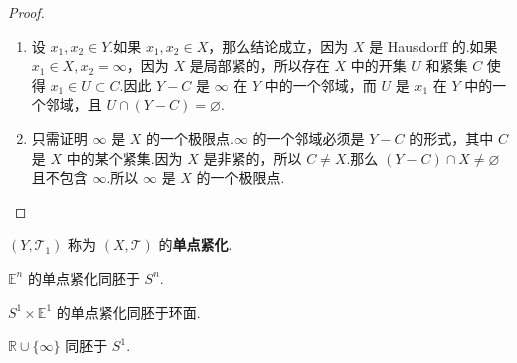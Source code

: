 \begin{proof}
\begin{enumerate}
        \item[(4)] 设 $x_1, x_2 \in Y$.如果 $x_1, x_2 \in X$，那么结论成立，因为 $X$ 是 Hausdorff 的.如果 $x_1 \in X, x_2 = \infty$，因为 $X$ 是局部紧的，所以存在 $X$ 中的开集 $U$ 和紧集 $C$ 使得 $x_1 \in U \subset C$.因此 $Y-C$ 是 $\infty$ 在 $Y$ 中的一个邻域，而 $U$ 是 $x_1$ 在 $Y$ 中的一个邻域，且 $U \cap (Y-C) = \varnothing$.
        \item[(5)] 只需证明 $\infty$ 是 $X$ 的一个极限点.$\infty$ 的一个邻域必须是 $Y-C$ 的形式，其中 $C$ 是 $X$ 中的某个紧集.因为 $X$ 是非紧的，所以 $C \neq X$.那么 $(Y-C) \cap X \neq \varnothing$ 且不包含 $\infty$.所以 $\infty$ 是 $X$ 的一个极限点.
    \end{enumerate}
\end{proof}

\begin{definition}[单点紧化]
    $(Y, \mathcal{T}_1)$ 称为 $(X, \mathcal{T})$ 的\textbf{单点紧化}.
\end{definition}

\begin{instance}
    $\mathbb{E}^n$ 的单点紧化同胚于 $S^n$.
\end{instance}

\begin{instance}
    $S^1 \times \mathbb{E}^1$ 的单点紧化同胚于环面.
\end{instance}

\begin{instance}
    $\mathbb{R} \cup \{\infty\}$ 同胚于 $S^1$.
\end{instance}


 

